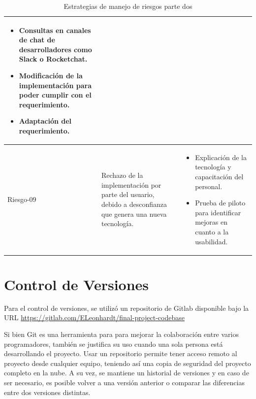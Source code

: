 \begin{table}[h]
\begin{tabular}{|C{2cm}|m{3.5cm}|C{8cm}|}
\begin{itemize}
        \item Consultas en canales de chat de desarrolladores como Slack o Rocketchat.
        \item Modificación de la implementación para poder cumplir con el requerimiento.
        \item Adaptación del requerimiento.
     \end{itemize}\\
     \hline
     Riesgo-09 & Rechazo de la implementación por parte del usuario, debido a desconfianza que genera una nueva tecnología. & \begin{itemize}
        \item Explicación de la tecnología y capacitación del personal.
        \item Prueba de piloto para identificar mejoras en cuanto a la usabilidad.
     \end{itemize}\\
     \hline
    \end{tabular}
    \caption{Estrategias de manejo de riesgos parte dos}
    \label{risk-strategy2}
\end{table}

\section{Control de Versiones}
Para el control de versiones, se utilizó un repositorio de Gitlab disponible bajo la URL \url{https://gitlab.com/ELeonhardt/final-project-codebase}

Si bien Git es una herramienta para para mejorar la colaboración entre varios programadores, también se justifica su uso cuando una sola persona está desarrollando el proyecto. Usar un repositorio permite tener acceso remoto al proyecto desde cualquier equipo, teniendo así una copia de seguridad del proyecto completo en la nube. A su vez, se mantiene un historial de versiones y en caso de ser necesario, es posible volver a una versión anterior o comparar las diferencias entre dos versiones distintas.

\newpage
